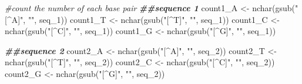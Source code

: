 \documentclass[
]{article}
\newenvironment{Shaded}{\begin{snugshade}}{\end{snugshade}}
\newcommand{\CommentTok}[1]{\textcolor[rgb]{0.56,0.35,0.01}{\textit{#1}}}
\newcommand{\DecValTok}[1]{\textcolor[rgb]{0.00,0.00,0.81}{#1}}
\newcommand{\DocumentationTok}[1]{\textcolor[rgb]{0.56,0.35,0.01}{\textbf{\textit{#1}}}}
\newcommand{\FunctionTok}[1]{\textcolor[rgb]{0.00,0.00,0.00}{#1}}
\newcommand{\NormalTok}[1]{#1}
\newcommand{\OtherTok}[1]{\textcolor[rgb]{0.56,0.35,0.01}{#1}}
\newcommand{\SpecialCharTok}[1]{\textcolor[rgb]{0.00,0.00,0.00}{#1}}
\newcommand{\StringTok}[1]{\textcolor[rgb]{0.31,0.60,0.02}{#1}}
\begin{document}
\begin{Shaded}
\end{Shaded}

\begin{Shaded}
\begin{Highlighting}[]
\CommentTok{\#count the number of each base pair}
\DocumentationTok{\#\#sequence 1}
\NormalTok{count1\_A }\OtherTok{\textless{}{-}} \FunctionTok{nchar}\NormalTok{(}\FunctionTok{gsub}\NormalTok{(}\StringTok{"[\^{}A]"}\NormalTok{, }\StringTok{""}\NormalTok{, seq\_1))}
\NormalTok{count1\_T }\OtherTok{\textless{}{-}} \FunctionTok{nchar}\NormalTok{(}\FunctionTok{gsub}\NormalTok{(}\StringTok{"[\^{}T]"}\NormalTok{, }\StringTok{""}\NormalTok{, seq\_1))}
\NormalTok{count1\_C }\OtherTok{\textless{}{-}} \FunctionTok{nchar}\NormalTok{(}\FunctionTok{gsub}\NormalTok{(}\StringTok{"[\^{}C]"}\NormalTok{, }\StringTok{""}\NormalTok{, seq\_1))}
\NormalTok{count1\_G }\OtherTok{\textless{}{-}} \FunctionTok{nchar}\NormalTok{(}\FunctionTok{gsub}\NormalTok{(}\StringTok{"[\^{}G]"}\NormalTok{, }\StringTok{""}\NormalTok{, seq\_1))}

\DocumentationTok{\#\#sequence 2}
\NormalTok{count2\_A }\OtherTok{\textless{}{-}} \FunctionTok{nchar}\NormalTok{(}\FunctionTok{gsub}\NormalTok{(}\StringTok{"[\^{}A]"}\NormalTok{, }\StringTok{""}\NormalTok{, seq\_2))}
\NormalTok{count2\_T }\OtherTok{\textless{}{-}} \FunctionTok{nchar}\NormalTok{(}\FunctionTok{gsub}\NormalTok{(}\StringTok{"[\^{}T]"}\NormalTok{, }\StringTok{""}\NormalTok{, seq\_2))}
\NormalTok{count2\_C }\OtherTok{\textless{}{-}} \FunctionTok{nchar}\NormalTok{(}\FunctionTok{gsub}\NormalTok{(}\StringTok{"[\^{}C]"}\NormalTok{, }\StringTok{""}\NormalTok{, seq\_2))}
\NormalTok{count2\_G }\OtherTok{\textless{}{-}} \FunctionTok{nchar}\NormalTok{(}\FunctionTok{gsub}\NormalTok{(}\StringTok{"[\^{}G]"}\NormalTok{, }\StringTok{""}\NormalTok{, seq\_2))}


\end{Highlighting}
\end{Shaded}
\end{document}
